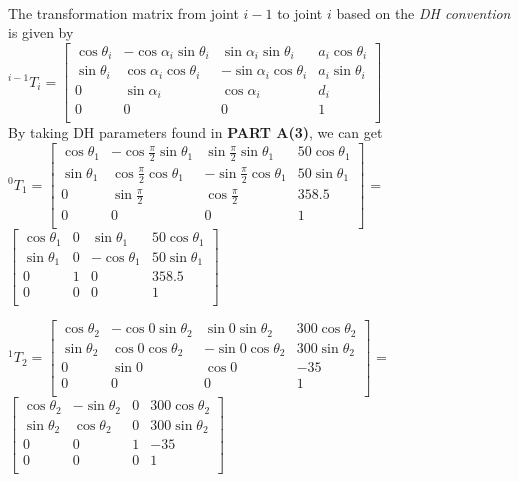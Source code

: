 \documentclass[12pt, a4paper]{article}
\begin{document}
\newpage
{} \\
The transformation matrix from joint $i - 1$ to joint $i$ based on the {\it DH convention} is given by \\
${ }^{i-1} T_{i} =
\begin{bmatrix}
\cos \theta_i & -\cos \alpha_i \sin \theta_i & \sin \alpha_i \sin \theta_i & a_i \cos \theta_i \\
\sin \theta_i & \cos \alpha_i \cos \theta_i & -\sin \alpha_i \cos \theta_i & a_i \sin \theta_i \\
0 & \sin \alpha_i & \cos \alpha_i & d_i \\
0 & 0 & 0 & 1 \\
\end{bmatrix}$
\\
By taking DH parameters found in {\bf PART A(3)}, we can get 
\\
\hspace*{-0.4cm} ${ }^{0} T_{1} =
\begin{bmatrix}
\cos \theta_1 & -\cos \frac{\pi}{2} \sin \theta_1 & \sin \frac{\pi}{2} \sin \theta_1 & 50 \cos \theta_1 \\
\sin \theta_1 & \cos \frac{\pi}{2} \cos \theta_1 & -\sin \frac{\pi}{2} \cos \theta_1 & 50 \sin \theta_1 \\
0 & \sin \frac{\pi}{2} & \cos \frac{\pi}{2} & 358.5 \\
0 & 0 & 0 & 1 \\
\end{bmatrix}$
= 
$\begin{bmatrix}
\cos \theta_1 & 0 & \sin \theta_1 & 50 \cos \theta_1 \\
\sin \theta_1 & 0 & - \cos \theta_1 & 50 \sin \theta_1 \\
0 & 1 & 0 & 358.5 \\
0 & 0 & 0 & 1 \\
\end{bmatrix}$

\hspace*{-1cm} ${ }^{1} T_{2} =
\begin{bmatrix}
\cos \theta_2 & -\cos 0 \sin \theta_2 & \sin 0 \sin \theta_2 & 300 \cos \theta_2 \\
\sin \theta_2 & \cos 0 \cos \theta_2 & -\sin 0 \cos \theta_2 & 300 \sin \theta_2 \\
0 & \sin 0 & \cos 0 & -35 \\
0 & 0 & 0 & 1 \\
\end{bmatrix}$
= 
$\begin{bmatrix}
\cos \theta_2 & -\sin \theta_2 & 0 & 300 \cos \theta_2 \\
\sin \theta_2 & \cos \theta_2 & 0 & 300 \sin \theta_2 \\
0 & 0 & 1 & -35 \\
0 & 0 & 0 & 1 \\
\end{bmatrix}$
\end{document}
